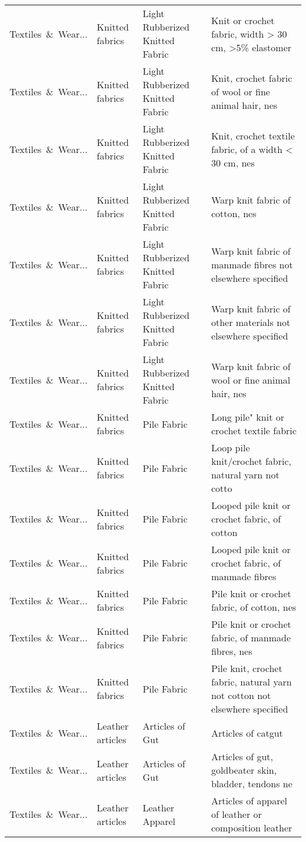 \begin{appendices}
\begin{xltabular}{\textwidth}{|p{0.10\textwidth}|p{0.25\textwidth}|p{0.24\textwidth}|p{0.31\textwidth}|}
Textiles\ \&\ Wear... & Knitted fabrics & Light Rubberized Knitted Fabric & Knit or crochet fabric, width > 30 cm, >5\% elastomer \\
Textiles\ \&\ Wear... & Knitted fabrics & Light Rubberized Knitted Fabric & Knit, crochet fabric of wool or fine animal hair, nes \\
Textiles\ \&\ Wear... & Knitted fabrics & Light Rubberized Knitted Fabric & Knit, crochet textile fabric, of a width < 30 cm, nes \\
Textiles\ \&\ Wear... & Knitted fabrics & Light Rubberized Knitted Fabric & Warp knit fabric of cotton, nes \\
Textiles\ \&\ Wear... & Knitted fabrics & Light Rubberized Knitted Fabric & Warp knit fabric of manmade fibres not elsewhere specified \\
Textiles\ \&\ Wear... & Knitted fabrics & Light Rubberized Knitted Fabric & Warp knit fabric of other materials not elsewhere specified \\
Textiles\ \&\ Wear... & Knitted fabrics & Light Rubberized Knitted Fabric & Warp knit fabric of wool or fine animal hair, nes \\
Textiles\ \&\ Wear... & Knitted fabrics & Pile Fabric & Long pile" knit or crochet textile fabric \\
Textiles\ \&\ Wear... & Knitted fabrics & Pile Fabric & Loop pile knit/crochet fabric, natural yarn not cotto \\
Textiles\ \&\ Wear... & Knitted fabrics & Pile Fabric & Looped pile knit or crochet fabric, of cotton \\
Textiles\ \&\ Wear... & Knitted fabrics & Pile Fabric & Looped pile knit or crochet fabric, of manmade fibres \\
Textiles\ \&\ Wear... & Knitted fabrics & Pile Fabric & Pile knit or crochet fabric, of cotton, nes \\
Textiles\ \&\ Wear... & Knitted fabrics & Pile Fabric & Pile knit or crochet fabric, of manmade fibres, nes \\
Textiles\ \&\ Wear... & Knitted fabrics & Pile Fabric & Pile knit, crochet fabric, natural yarn not cotton not elsewhere specified \\
Textiles\ \&\ Wear... & Leather articles & Articles of Gut & Articles of catgut \\
Textiles\ \&\ Wear... & Leather articles & Articles of Gut & Articles of gut, goldbeater skin, bladder, tendons ne \\
Textiles\ \&\ Wear... & Leather articles & Leather Apparel & Articles of apparel of leather or composition leather \\

\end{xltabular}
\end{appendices}
